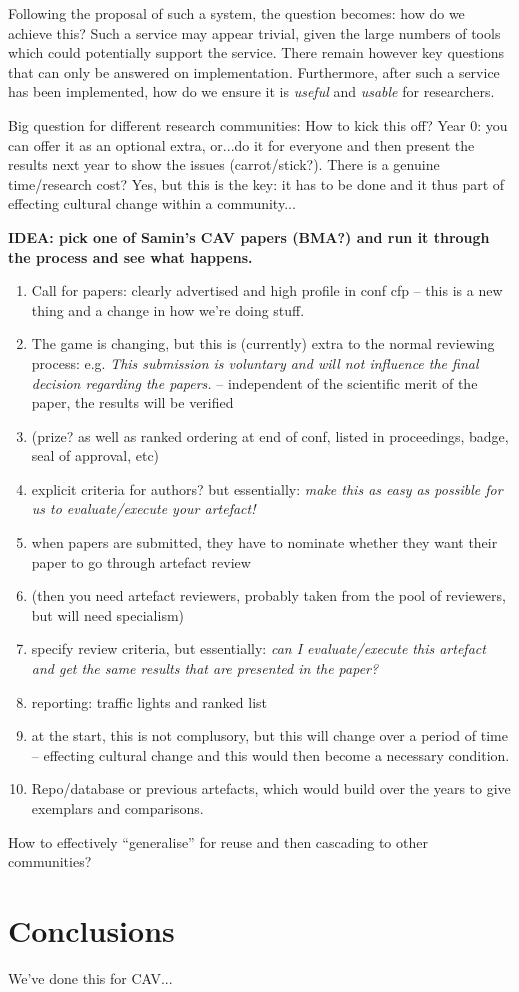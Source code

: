 \documentclass{llncs}
\begin{document}
Following the proposal of such a system, the question becomes: how do we achieve 
this? Such a service may appear trivial, given the large numbers of tools which
could potentially support the service. There remain however key questions that
can only be answered on implementation. Furthermore, after such a service has been
implemented, how do we ensure it is \emph{useful} and \emph{usable} for researchers.

Big question for different research communities: How to kick this off?
Year 0: you can offer it as an optional extra, or...do it for everyone
and then present the results next year to show the issues
(carrot/stick?). There is a genuine time/research cost? Yes, but this
is the key: it has to be done and it thus part of effecting cultural
change within a community...


{\textbf{IDEA: pick one of Samin's CAV papers (BMA?) and run it through the process
and see what happens.}}


\begin{enumerate}
\item Call for papers: clearly advertised and high profile in conf cfp
  -- this is a new thing and a change in how we're doing stuff.
\item The game is changing, but this is (currently) extra to the
  normal reviewing process: 
e.g. {\emph{This submission is voluntary and will not influence the final decision
regarding the papers.}} -- independent of the scientific merit of the
paper, the results will be verified 
\item (prize? as well as ranked ordering at end of conf, listed in
  proceedings, badge, seal of approval, etc)
\item explicit criteria for authors? but essentially: {\emph{make this
      as easy as possible for us to evaluate/execute your artefact!}}
\item when papers are submitted, they have to nominate whether they
  want their paper to go through artefact review
\item (then you need artefact reviewers, probably taken from the pool of
  reviewers, but will need specialism)
\item specify review criteria, but essentially: {\emph{can I evaluate/execute this
  artefact and get the same results that are presented in the paper?}}
\item reporting: traffic lights and ranked list
\item at the start, this is not complusory, but this will change over a period of
time -- effecting cultural change and this would then become a
necessary condition.
\item Repo/database or previous artefacts, which would build over the
  years to give exemplars and comparisons.
\end{enumerate}

How to effectively ``generalise'' for reuse and then cascading to other communities?

\section{Conclusions}\label{concl}
We've done this for CAV...





\end{document}
